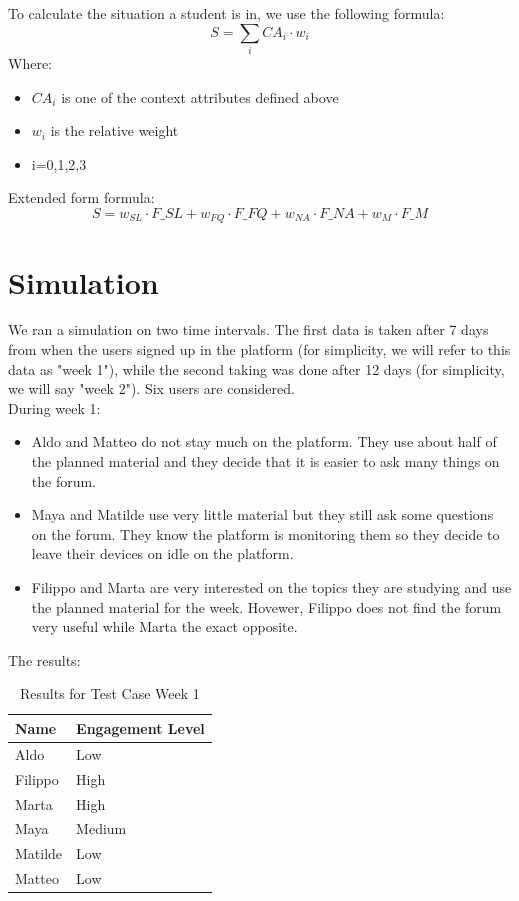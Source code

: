 To calculate the situation a student is in, we use the following formula:
\[ 
S = \sum_i CA_i \cdot w_i 
\]
Where:
\begin{itemize}
    \item $CA_i$ is one of the context attributes defined above
    \item $w_i$ is the relative weight
    \item i=0,1,2,3
\end{itemize}
Extended form formula:
\[
S = w_{SL} \cdot F\_SL + w_{FQ} \cdot F\_FQ + w_{NA} \cdot F\_NA + w_M \cdot F\_M
\]

\section{Simulation}
We ran a simulation on two time intervals. The first data is taken after 7 days from when 
the users signed up in the platform (for simplicity, we will refer to this data as "week 1"), 
while the second taking was done after 12 days (for simplicity, we will say "week 2"). Six users 
are considered.\\
During week 1:
\begin{itemize}
    \item Aldo and Matteo do not stay much on the platform. They use about half of the planned 
    material and they decide that it is easier to ask many things on the forum.
    \item Maya and Matilde use very little material but they still ask some questions on the forum. 
    They know the platform is monitoring them so they decide to leave their devices on idle on the
     platform.
    \item Filippo and Marta are very interested on the topics they are studying and use the planned 
    material for the week. Hovewer, Filippo does not find the forum very useful while Marta the exact 
    opposite.
\end{itemize}

The results:\\
\vspace{1em}
\begin{table}[H]
\centering
\begin{tabular}{l l}
\toprule
Name     & Engagement Level \\
\midrule
Aldo     & Low \\
Filippo  & High \\
Marta    & High \\
Maya     & Medium \\
Matilde  & Low \\
Matteo   & Low \\
\bottomrule
\end{tabular}
\caption{Results for Test Case Week 1}
\end{table}
\vspace{1em}

